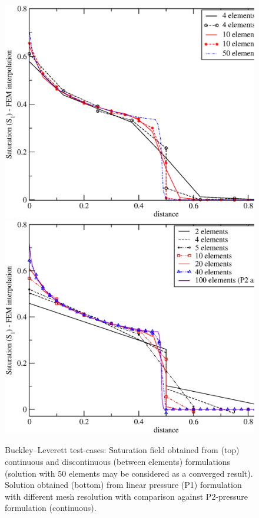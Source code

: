 \begin{figure}[h]
\vbox{
\hbox{\hspace{.3cm}\includegraphics[width=.9\textwidth]{diagrams/bl-dg-4-10-vers-cty.eps}}
\vspace{-0.cm}
\hbox{\hspace{.3cm}\includegraphics[width=.9\textwidth]{diagrams/bl-dg-p1-2-4-5-10-20-40.eps}}}
\caption{Buckley--Leverett test-cases: Saturation field obtained from
  (top) continuous and discontinuous (between elements) formulations
  (solution with 50 elements may be considered as a converged
  result). Solution obtained (bottom) from linear pressure (P1)
  formulation with different mesh resolution with comparison against
  P2-pressure formulation (continuous). \label{bl-dg-4-10-vers-cty}}
\end{figure}


